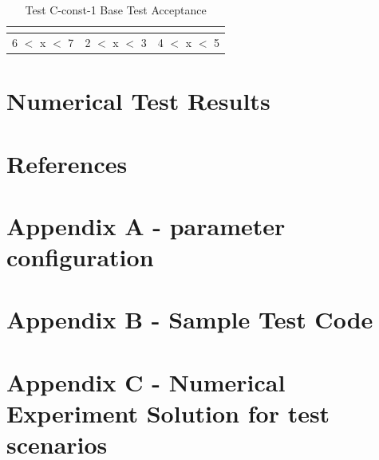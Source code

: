 \documentclass[11pt,letterpaper]{article}
\begin{document}
\begin{table}[H]
	\centering
	\caption{Test C-const-1 Base Test Acceptance}
	\label{tab:test-C-const-1base}
	\begin{tabular}{|P{6.5cm}|P{6.5cm}|}
		\hline
		\textbf{} &\textbf{} & \textbf{}\\
		 $<$ x $<$ 7 & 2 $<$ x $<$ 3 & 4 $<$ x $<$ 5\\
		\hline
	\end{tabular}
\end{table}

\section{Numerical Test Results}


\section{References}


\section*{Appendix A - parameter configuration}

\section*{Appendix B - Sample Test Code }

\section*{Appendix C - Numerical Experiment Solution for test scenarios}
\end{document}
